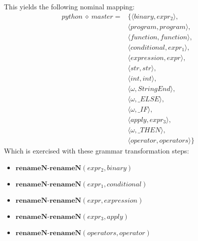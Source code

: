 This yields the following nominal mapping:
\begin{align*}\mathit{python} \:\diamond\: \mathit{master} =& \{\langle \mathit{binary},\mathit{expr_2}\rangle,\\
 & \langle \mathit{program},\mathit{program}\rangle,\\
 & \langle \mathit{function},\mathit{function}\rangle,\\
 & \langle \mathit{conditional},\mathit{expr_1}\rangle,\\
 & \langle \mathit{expression},\mathit{expr}\rangle,\\
 & \langle str,str\rangle,\\
 & \langle int,int\rangle,\\
 & \langle \omega,\mathit{StringEnd}\rangle,\\
 & \langle \omega,\mathit{\_ ELSE}\rangle,\\
 & \langle \omega,\mathit{\_ IF}\rangle,\\
 & \langle \mathit{apply},\mathit{expr_3}\rangle,\\
 & \langle \omega,\mathit{\_ THEN}\rangle,\\
 & \langle \mathit{operator},\mathit{operators}\rangle\}\end{align*}
 Which is exercised with these grammar transformation steps:

{\footnotesize\begin{itemize}
\item $\mathbf{renameN\text{-}renameN}\left(\mathit{expr_2},\mathit{binary}\right)$
\item $\mathbf{renameN\text{-}renameN}\left(\mathit{expr_1},\mathit{conditional}\right)$
\item $\mathbf{renameN\text{-}renameN}\left(\mathit{expr},\mathit{expression}\right)$
\item $\mathbf{renameN\text{-}renameN}\left(\mathit{expr_3},\mathit{apply}\right)$
\item $\mathbf{renameN\text{-}renameN}\left(\mathit{operators},\mathit{operator}\right)$
\end{itemize}}

